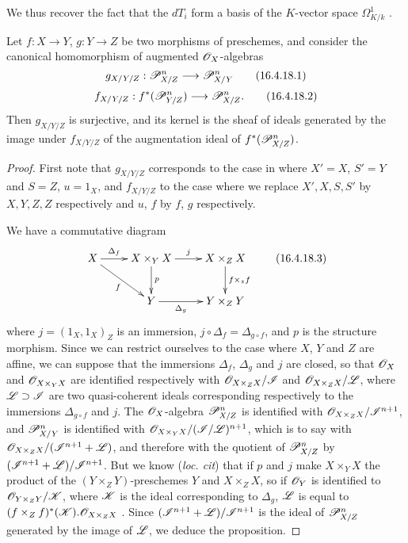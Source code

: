 We thus recover the fact that the $dT_i$ form a basis of the $K$-vector space $\Omega_{K/k}^1$ .

\begin{env}[16.4.18]
\label{IV.16.4.18}
Let $f:X \to Y$, $g:Y \to Z$ be two morphisms of preschemes, and consider the canonical homomorphism of augmented $\mathscr{O}_X$-algebras 
\[
  \label{IV.16.4.18.1}
  g_{X/Y/Z}:\sh{P}_{X/Z}^n \to \sh{P}_{X/Y}^n
  \tag{16.4.18.1}
\]
\[
  \label{IV.16.4.18.2}
  f_{X/Y/Z}:f^*(\sh{P}_{Y/Z}^n) \to \sh{P}_{X/Z}^n.
  \tag{16.4.18.2}
\]
Then $g_{X/Y/Z}$ is surjective, and its kernel is the sheaf of ideals generated by the image under $f_{X/Y/Z}$ of the augmentation ideal of $f^*(\mathscr{P}_{X/Z}^n)$.
\end{env}

\begin{proof}
First note that $g_{X/Y/Z}$ corresponds to the case in  where $X' = X$, $S' = Y$ and $S = Z$, $u = 1_X$, and $f_{X/Y/Z}$ to the case where we replace $X', X, S, S'$ by $X, Y, Z, Z$ respectively and $u$, $f$ by $f$, $g$ respectively.

We have a commutative diagram 
\[
  \label{IV.16.4.18.3}
  \xymatrix{
    X \ar[r]^-{\Delta_f} \ar[dr]_-f & X \times_Y X \ar[d]^-p \ar[r]^-j & X \times_Z X \ar[d]^-{f \times_z f} \\
    &   Y \ar[r]_-{\Delta_g}  & Y \times_Z Y
  }
  \tag{16.4.18.3}
\] 
where $j = (1_X, 1_X)_Z$ is an immersion, $j \circ \Delta_f = \Delta_{g \circ f}$, and $p$ is the structure morphism.
Since we can restrict ourselves to the case where $X$, $Y$ and $Z$ are affine, we can suppose that the immersions $\Delta_f$, $\Delta_g$ and $j$ are closed, so that $\mathscr{O}_X$ and $\mathscr{O}_{X \times_Y X}$ are identified respectively with $\mathscr{O}_{X \times_Z X} / \mathscr{I}$ and $\mathscr{O}_{X \times_Z X}/\mathscr{L}$, where $\mathscr{L} \supset \mathscr{I}$ are two quasi-coherent ideals corresponding respectively to the immersions $\Delta_{g \circ f} $ and $j$.
The $\mathscr{O}_X$-algebra $\mathscr{P}_{X/Z}^n$ is identified with $\mathscr{O}_{X \times_Z X} / \mathscr{I}^{n+1}$, and $\mathscr{P}_{X/Y}^n$ is identified with $\mathscr{O}_{X \times_Y X}/(\mathscr{I}/\mathscr{L})^{n+1}$, which is to say with $\mathscr{O}_{X \times_Z X}/(\mathscr{I}^{n+1} + \mathscr{L})$, and therefore with the quotient of $\mathscr{P}_{X/Z}^n$ by $(\mathscr{I}^{n+1} + \mathscr{L})/\mathscr{I}^{n+1}$.
But we know (\emph{loc. cit}) that if $p$ and $j$ make $X \times_Y X$ the product of the $(Y \times_Z Y)$-preschemes $Y$ and $X \times_Z X$, so if $\mathscr{O}_Y$ is identified to $\mathscr{O}_{Y \times_Z Y}/\mathscr{K}$, where $\mathscr{K}$ is the ideal corresponding to $\Delta_g$, $\mathscr{L}$ is equal to $(f\times_Z f)^*(\mathscr{K}).\mathscr{O}_{X \times_Z X}$ .
Since $(\mathscr{I}^{n+1} + \mathscr{L})/\mathscr{I}^{n+1}$ is the ideal of $\mathscr{P}_{X/Z}^n$ generated by the image of $\mathscr{L}$, we deduce the proposition.
\end{proof}

